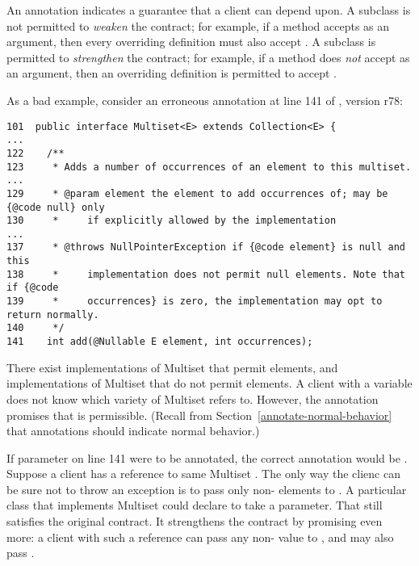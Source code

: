 An annotation indicates a guarantee that a client can depend upon.  A subclass
is not permitted to \emph{weaken} the contract; for example,
if a method accepts  as an argument, then every overriding
definition must also accept .
A subclass is permitted to \emph{strengthen} the contract; for example,
if a method does \emph{not} accept  as an argument, then an 
overriding definition is permitted to accept .

As a bad example, consider an erroneous  annotation at
line 141 of , version r78:

\begin{Verbatim}
101  public interface Multiset<E> extends Collection<E> {
...
122    /**
123     * Adds a number of occurrences of an element to this multiset.
...
129     * @param element the element to add occurrences of; may be {@code null} only
130     *     if explicitly allowed by the implementation
...
137     * @throws NullPointerException if {@code element} is null and this
138     *     implementation does not permit null elements. Note that if {@code
139     *     occurrences} is zero, the implementation may opt to return normally.
140     */
141    int add(@Nullable E element, int occurrences);
\end{Verbatim}

There exist implementations of Multiset that permit  elements,
and implementations of Multiset that do not permit  elements.  A
client with a variable  does not know which variety of
Multiset  refers to.  However, the  annotation
promises that  is permissible.  (Recall from
Section~\ref{annotate-normal-behavior} that annotations should indicate
normal behavior.)

If parameter  on line 141 were to be annotated, the correct
annotation would be .  Suppose a client has a reference to
same Multiset .  The only way the clienc can be sure not to throw an exception is to pass
only non- elements to .  A particular class
that implements Multiset could declare  to take a
 parameter.  That still satisfies the original contract.
It strengthens the contract by promising even more:  a client with such a
reference can pass any non- value to , and may also
pass .

